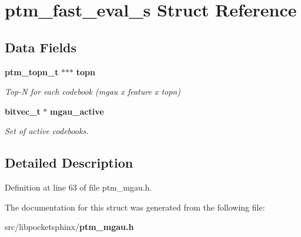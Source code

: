 \section{ptm\-\_\-fast\-\_\-eval\-\_\-s \-Struct \-Reference}
\label{structptm__fast__eval__s}
\subsection*{\-Data \-Fields}
\begin{DoxyCompactItemize}
\item 
{\bf ptm\-\_\-topn\-\_\-t} $\ast$$\ast$$\ast$ {\bf topn}\label{structptm__fast__eval__s_a95e382028ed8a0af8b56bfcb797af96b}

\begin{DoxyCompactList}\small\item\em \-Top-\/\-N for each codebook (mgau x feature x topn) \end{DoxyCompactList}\item 
{\bf bitvec\-\_\-t} $\ast$ {\bf mgau\-\_\-active}\label{structptm__fast__eval__s_ac5d3b21239d567b395015d7c4fea157c}

\begin{DoxyCompactList}\small\item\em \-Set of active codebooks. \end{DoxyCompactList}\end{DoxyCompactItemize}


\subsection{\-Detailed \-Description}


\-Definition at line 63 of file ptm\-\_\-mgau.\-h.



\-The documentation for this struct was generated from the following file\-:\begin{DoxyCompactItemize}
\item 
src/libpocketsphinx/{\bf ptm\-\_\-mgau.\-h}\end{DoxyCompactItemize}

